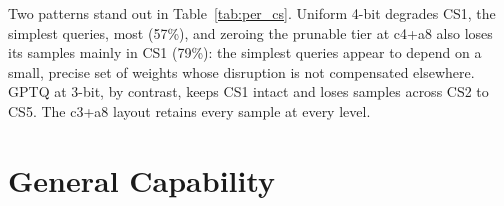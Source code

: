 \documentclass[11pt]{article}
\begin{document}
\begin{table}[t]
\centering
\small
\setlength{\tabcolsep}{3pt}
\caption{Retention (\%) by SQL complexity level on Gemma-2-2B 
(CS1 simplest, CS5 most complex). Baseline-correct samples: 
CS1 = 28, CS2 = 25, CS3 = 23, CS4 = 15, CS5 = 14; CS4 and CS5 
are small and per-level numbers should be read with caution.}
\label{tab:per_cs}
\end{table}

Two patterns stand out in Table~\ref{tab:per_cs}. Uniform 
4-bit degrades CS1, the simplest queries, most (57\%), and 
zeroing the prunable tier at c4+a8 also loses its samples 
mainly in CS1 (79\%): the simplest queries appear to depend on 
a small, precise set of weights whose disruption is not 
compensated elsewhere. GPTQ at 3-bit, by contrast, keeps CS1 
intact and loses samples across CS2 to CS5. The c3+a8 layout 
retains every sample at every level.

\section{General Capability}
\label{app:ppl}
\end{document}
